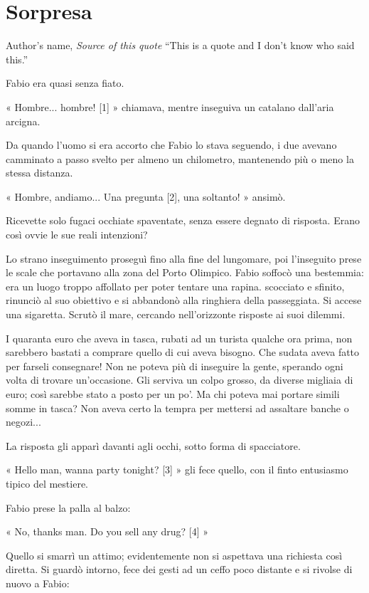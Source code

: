\chapter{Sorpresa}

\begin{chapquote}{Author's name, \textit{Source of this quote}}
``This is a quote and I don't know who said this.''
\end{chapquote}



 Fabio era quasi senza fiato.

« Hombre... hombre! [1] » chiamava, mentre inseguiva un catalano dall'aria arcigna. 

Da quando l'uomo si era accorto che Fabio lo stava seguendo, i due avevano camminato a passo svelto per almeno un chilometro, mantenendo più o meno la stessa distanza.

« Hombre, andiamo... Una pregunta [2], una soltanto! » ansimò. 

Ricevette solo fugaci occhiate spaventate, senza essere degnato di risposta. Erano così ovvie le sue reali intenzioni?

Lo strano inseguimento proseguì fino alla fine del lungomare, poi l'inseguito prese le scale che portavano alla zona del Porto Olimpico. Fabio soffocò una bestemmia: era un luogo troppo affollato per poter tentare una rapina. scocciato e sfinito, rinunciò al suo obiettivo e si abbandonò alla ringhiera della passeggiata. Si accese una sigaretta. Scrutò il mare, cercando nell'orizzonte risposte ai suoi dilemmi.

I quaranta euro che aveva in tasca, rubati ad un turista qualche ora prima, non sarebbero bastati a comprare quello di cui aveva bisogno. Che sudata aveva fatto per farseli consegnare! Non ne poteva più di inseguire la gente, sperando ogni volta di trovare un'occasione. Gli serviva un colpo grosso, da diverse migliaia di euro; così sarebbe stato a posto per un po'. Ma chi poteva mai portare simili somme in tasca? Non aveva certo la tempra per mettersi ad assaltare banche o negozi...

La risposta gli apparì davanti agli occhi, sotto forma di spacciatore.

« Hello man, wanna party tonight? [3] » gli fece quello, con il finto entusiasmo tipico del mestiere.

Fabio prese la palla al balzo:

« No, thanks man. Do you sell any drug? [4] »

Quello si smarrì un attimo; evidentemente non si aspettava una richiesta così diretta. Si guardò intorno, fece dei gesti ad un ceffo poco distante e si rivolse di nuovo a Fabio:

